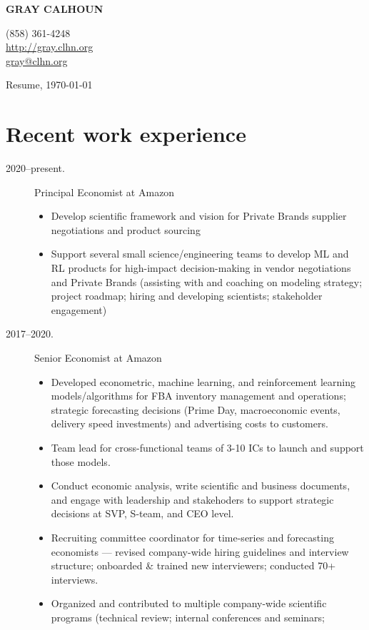 \documentclass[11pt]{safecv}%
\begin{document}
\MakeUppercase{\textbf{Gray Calhoun}}
\hfill
\parbox[t][0pt]{5cm}{%
\hfill (858) 361-4248\\
\hfill \url{http://gray.clhn.org}\\
\hfill \url{gray@clhn.org}
}

\vspace{\itemsep}%
Resume, \today

\section*{Recent work experience}

\begin{description}
\item[2020--present.] Principal Economist at Amazon
  \begin{itemize}
  \item Develop scientific framework and vision for Private Brands
    supplier negotiations and product sourcing 
  \item Support several small science/engineering teams to develop ML
    and RL products for high-impact decision-making in vendor
    negotiations and Private Brands (assisting with and coaching on
    modeling strategy; project roadmap; hiring and developing
    scientists; stakeholder engagement)
  \end{itemize}
\item[2017--2020.] Senior Economist at Amazon
  \begin{itemize}
  \item Developed econometric, machine learning, and reinforcement
    learning models/algorithms for FBA inventory management and
    operations; strategic forecasting decisions (Prime Day,
    macroeconomic events, delivery speed investments) and advertising costs to customers.
  \item Team lead for cross-functional teams of 3-10 ICs to launch and support those models.
  \item Conduct economic analysis, write scientific and business
    documents, and engage with leadership and stakehoders to
    support strategic decisions at SVP, S-team, and CEO level.
  \item Recruiting committee coordinator for time-series and
    forecasting economists --- revised company-wide hiring guidelines
    and interview structure; onboarded \& trained new interviewers;
    conducted 70+ interviews.
  \item Organized and contributed to multiple company-wide scientific
    programs (technical review; internal conferences and seminars;

\end{itemize}
\end{description}
\end{document}
